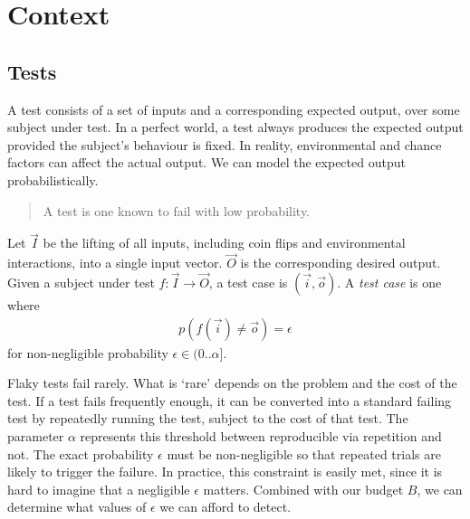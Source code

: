 \section{Context}
\label{sec:context}



\subsection{\Flaky Tests}
\label{sec:sec:flaky_tests}

A test consists of a set of inputs and a corresponding expected output, over
some subject under test. In a perfect world, a test always produces the expected
output provided the subject's behaviour is fixed. In reality, environmental and
chance factors can affect the actual output. We can model the expected output
probabilistically.

\begin{quote}
	A \flaky test is one known to fail with low probability.
\end{quote}

\begin{defn}
\label{def:flaky_test}

Let $\vec{I}$ be the lifting of all inputs, including coin flips and
environmental interactions, into a single input vector. $\vec{O}$ is the
corresponding desired output. Given a subject under test $f: \vec{I} \rightarrow
\vec{O}$, a test case is $(\vec{i},\vec{o})$. A \emph{\flaky test case} is one
where
%
\begin{align*}
  p(f(\vec{i}) \ne \vec{o}) = \epsilon
\end{align*}
%
for non-negligible probability $\epsilon \in (0..\alpha]$.

\end{defn}

Flaky tests fail rarely.  What is {\lq}rare{\rq} depends on the problem and the
cost of the test.  If a test fails frequently enough, it can be converted into a
standard failing test by repeatedly running the test, subject to the cost of
that test.  The parameter $\alpha$ represents this threshold between
reproducible via repetition and not.  The exact probability $\epsilon$ must be
non-negligible so that repeated trials are likely to trigger the failure.  In
practice, this constraint is easily met, since it is hard to imagine that a
negligible $\epsilon$ matters.  Combined with our budget $B$, we can determine
what values of $\epsilon$ we can afford to detect. 

